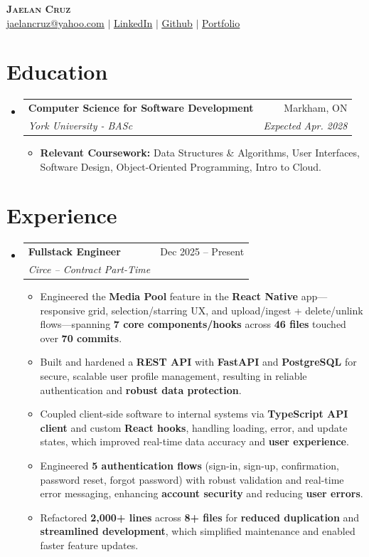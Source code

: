 \documentclass[letterpaper,10pt]{article}
\makeatletter
\newcommand{\resumeItem}[1]{
  \item\small{
    {#1 \vspace{-2pt}}
  }
}
\newcommand{\resumeSubheading}[4]{
  \vspace{-2pt}\item
    \begin{tabular*}{0.97\textwidth}[t]{l@{\extracolsep{\fill}}r}
      \textbf{#1} & #2 \\
      \textit{\small#3} & \textit{\small #4} \\
    \end{tabular*}\vspace{-7pt}
}
\newcommand{\resumeSubHeadingListStart}{\begin{itemize}[leftmargin=0.15in, label={}]}
\newcommand{\resumeSubHeadingListEnd}{\end{itemize}}
\newcommand{\resumeItemListStart}{\begin{itemize}}
\newcommand{\resumeItemListEnd}{\end{itemize}\vspace{-5pt}}
\makeatother
\begin{document}
\begin{center}
    \textbf{\huge \scshape Jaelan Cruz} \\ \vspace{1pt}
    \href{mailto:jaelancruz@yahoo.com}{\underline{jaelancruz@yahoo.com}} $|$ 
    \href{https://linkedin.com/in/jaelan-cruz}{\underline{LinkedIn}} $|$
    \href{https://github.com/mxta-o}{\underline{Github}} $|$
    \href{https://mxta-o.github.io}{\underline{Portfolio}}
\end{center}

\section{Education}
  \resumeSubHeadingListStart
    \resumeSubheading
      {Computer Science for Software Development}{Markham, ON}
      {York University - BASc}{Expected Apr. 2028}
      \resumeItemListStart
        \resumeItem{\textbf{Relevant Coursework:} Data Structures \& Algorithms, User Interfaces, Software Design, Object-Oriented Programming, Intro to Cloud.}
      \resumeItemListEnd
  \resumeSubHeadingListEnd


\section{Experience}
  \resumeSubHeadingListStart

    \resumeSubheading
      {Fullstack Engineer}{Dec 2025 -- Present}
      {Circe -- Contract Part-Time}{}
      \resumeItemListStart
        \resumeItem{Engineered the \textbf{Media Pool} feature in the \textbf{React Native} app---responsive grid, selection/starring UX, and upload/ingest + delete/unlink flows---spanning \textbf{7 core components/hooks} across \textbf{46 files} touched over \textbf{70 commits}.}
        \resumeItem{Built and hardened a \textbf{REST API} with \textbf{FastAPI} and \textbf{PostgreSQL} for secure, scalable user profile management, resulting in reliable authentication and \textbf{robust data protection}.}
        \resumeItem{Coupled client-side software to internal systems via \textbf{TypeScript API client} and custom \textbf{React hooks}, handling loading, error, and update states, which improved real-time data accuracy and \textbf{user experience}.}
        \resumeItem{Engineered \textbf{5 authentication flows} (sign-in, sign-up, confirmation, password reset, forgot password) with robust validation and real-time error messaging, enhancing \textbf{account security} and reducing \textbf{user errors}.}
        \resumeItem{Refactored \textbf{2,000+ lines} across \textbf{8+ files} for \textbf{reduced duplication} and \textbf{streamlined development}, which simplified maintenance and enabled faster feature updates.}
      \resumeItemListEnd
    \resumeSubHeadingListEnd
\end{document}

